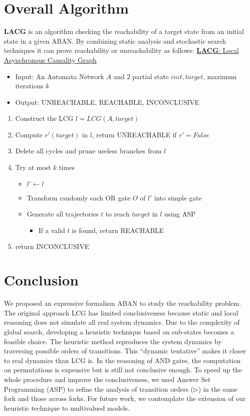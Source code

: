 \documentclass[en]{jdoc}
\begin{document}
\section{Overall Algorithm}
{\bf LACG} is an algorithm checking the reachability of a target state from an initial state in a given ABAN. By combining static analysis and stochastic search techniques it can prove reachability or unreachability as follows:
\uline{{\bf LACG}: Local Asynchronous Causality Graph}
\begin{itemize}
    \item Input: An Automata Network $A$ and 2 partial state $init, target$, maximum iterations $k$ 
    \item Output: UNREACHABLE, REACHABLE, INCONCLUSIVE
\end{itemize}
\begin{enumerate}
    \item Construct the LCG $l=LCG(A,target)$
    \item Compute $r'(target)$ in $l$, return UNREACHABLE if $r'=False$
    \item Delete all cycles and prune useless branches from $l$
    \item Try at most $k$ times
    \begin{itemize}
    \item $l'\gets l$
    \item  Transform randomly each OR gate $O$ of $l'$ into simple gate
    \item Generate all trajectories $t$ to reach $target$ in $l$ using ASP
    \begin{itemize}
        \item If a valid $t$ is found, return REACHABLE
    \end{itemize}
    \end{itemize}
    \item return INCONCLUSIVE
\end{enumerate}
\section{Conclusion}
We proposed an expressive formalism ABAN to study the reachability problem. The original approach LCG has limited conclusiveness because static and local reasoning does not simulate all real system dynamics. Due to the complexity of global search, developing a heuristic technique based on sub-states becomes a feasible choice. The heuristic method reproduces the system dynamics by traversing possible orders of transitions. This ``dynamic tentative'' makes it closer to real dynamics than LCG is.
In the reasoning of AND gates, the computation on permutations is expensive but is still not conclusive enough. To speed up the whole procedure and improve the conclusiveness, we used Answer Set Programming (ASP) to refine the analysis of transition orders ($\triangleright$) in the same fork and those across forks. For future work, we contemplate the extension of our heuristic technique to multivalued models.

\end{document}
